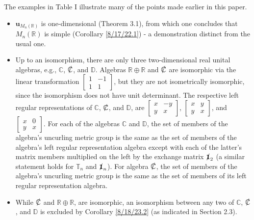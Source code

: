 \documentclass{amsart}
\numberwithin{equation}{section}
\theoremstyle{definition}
\numberwithin{theorem}{section}
\begin{document}
\bigskip

The examples in Table I illustrate many of the points made earlier in this paper.    
 
\begin{itemize}\item $\mathbf{u}_{M_n(\mathbb{R})}$ is one-dimensional (Theorem 3.1), from which one concludes that $M_n(\mathbb{R})$ is simple (Corollary \ref{8/17/22.1}) - a demonstration distinct from the usual one.
\item Up to an isomorphism, there are only three two-dimensional real unital algebras, e.g., $\mathbb{C}$, $\slashed{\mathbb{C}}$, and $\mathbb{D}$.  Algebras $\mathbb{R}\oplus\mathbb{R}$ and $\slashed{\mathbb{C}}$ are isomorphic via the linear transformation $\left[\begin{array}{ccc}
 1 & -1   \\ 
 1 & 1    
\end{array}\right]$, but they are not isometrically isomorphic, since the isomorphism does not have unit determinant.  The respective left regular representations of $\mathbb{C}$, $\slashed{\mathbb{C}}$, and $\mathbb{D}$, are $\left[\begin{array}{ccc}
 x & -y   \\ 
 y & x    
\end{array}\right]$, $\left[\begin{array}{ccc}
 x & y   \\ 
 y & x    
\end{array}\right]$, and $\left[\begin{array}{ccc}
 x & 0   \\ 
 y & x    
\end{array}\right]$.  For each of the algebras $\mathbb{C}$ and $\mathbb{D}$, the set of members of the algebra's uncurling metric group is the same as the set of members of the algebra's left regular representation algebra except with each of the latter's matrix members multiplied on the left by the exchange matrix $\slashed{\mathbf{1}}_2$ (a similar statement holds for $\mathbb{T}_n$ and $\slashed{\mathbf{1}}_n$). For algebra $\slashed{\mathbb{C}}$, the set of members of the algebra's uncurling metric group is the same as the set of members of its left regular representation algebra. \item While $\slashed{\mathbb{C}}$ and $\mathbb{R}\oplus\mathbb{R}$, are isomorphic, an isomorphism between any two of $\mathbb{C}$, $\slashed{\mathbb{C}}$, and $\mathbb{D}$ is excluded by Corollary \ref{8/18/23.2} (as indicated in Section 2.3).  

\end{itemize}
\end{document}
